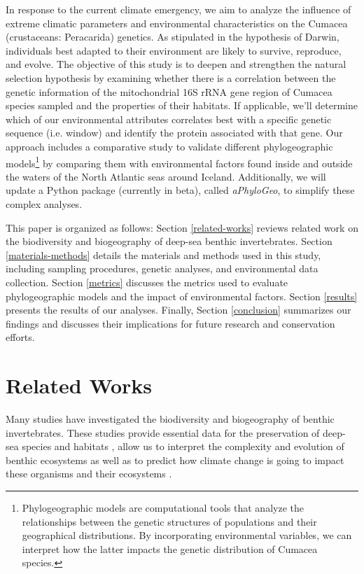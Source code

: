 In response to the current climate emergency, we aim to analyze the influence of extreme climatic parameters and environmental characteristics on the Cumacea (crustaceans: Peracarida) genetics. As stipulated in the hypothesis of Darwin, individuals best adapted to their environment are likely to survive, reproduce, and evolve. The objective of this study is to deepen and strengthen the natural selection hypothesis by examining whether there is a correlation between the genetic information of the mitochondrial 16S rRNA gene region of Cumacea species sampled and the properties of their habitats. If applicable, we'll determine which of our environmental attributes correlates best with a specific genetic sequence (i.e. window) and identify the protein associated with that gene. Our approach includes a comparative study to validate different {phylogeographic models}\footnote{Phylogeographic models are computational tools that analyze the relationships between the genetic structures of populations and their geographical distributions. By incorporating environmental variables, we can interpret how the latter impacts the genetic distribution of Cumacea species.} by comparing them with environmental factors found inside and outside the waters of the North Atlantic seas around Iceland. Additionally, we will update a Python package (currently in beta), called \textit{aPhyloGeo}, to simplify these complex analyses.

This paper is organized as follows: Section \autoref{related-works} reviews related work on the biodiversity and biogeography of deep-sea benthic invertebrates. Section \autoref{materials-methods} details the materials and methods used in this study, including sampling procedures, genetic analyses, and environmental data collection. Section \autoref{metrics} discusses the metrics used to evaluate phylogeographic models and the impact of environmental factors. Section \autoref{results} presents the results of our analyses. Finally, Section \autoref{conclusion} summarizes our findings and discusses their implications for future research and conservation efforts.

\section{Related Works}\label{related-works}
Many studies have investigated the biodiversity and biogeography of benthic invertebrates. These studies provide essential data for the preservation of deep-sea species and habitats \citep{halpern2008global}, allow us to interpret the complexity and evolution of benthic ecosystems \citep{danovaro2008exponential} as well as to predict how climate change is going to impact these organisms and their ecosystems \citep{cheung2009projecting}. 


